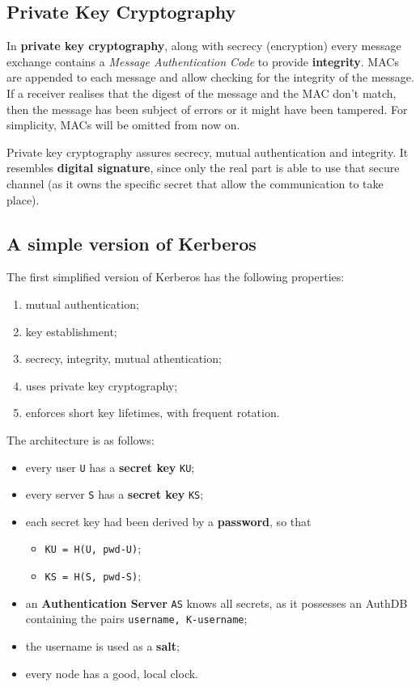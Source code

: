 \documentclass[10pt]{\classname}
\begin{document}
\subsection{Private Key Cryptography}

In \textbf{private key cryptography}, along with secrecy (encryption) every
message exchange contains a \emph{Message Authentication Code} to provide
\textbf{integrity}. MACs are appended to each message and allow checking for
the integrity of the message. If a receiver realises that the digest of the
message and the MAC don't match, then the message has been subject of errors or it
might have been tampered. For simplicity, MACs will be omitted from now on.

Private key cryptography assures secrecy, mutual authentication and integrity.
It resembles \textbf{digital signature}, since only the real part is able to
use that secure channel (as it owns the specific secret that allow the
communication to take place).

\subsection{A simple version of Kerberos}

The first simplified version of Kerberos has the following properties:
\begin{enumerate}
    \item mutual authentication;
    \item key establishment;
    \item secrecy, integrity, mutual athentication;
    \item uses private key cryptography;
    \item enforces short key lifetimes, with frequent rotation.
\end{enumerate}

The architecture is as follows:
\begin{itemize}
    \item every user \texttt{U} has a \textbf{secret key} \texttt{KU};
    \item every server \texttt{S} has a \textbf{secret key} \texttt{KS};
    \item each secret key had been derived by a \textbf{password}, so that
    \begin{itemize}
        \item \texttt{KU = H(U, pwd-U)};
        \item \texttt{KS = H(S, pwd-S)};
    \end{itemize}
    \item an \textbf{Authentication Server} \texttt{AS} knows all secrets, as it
        possesses an AuthDB containing the pairs \texttt{username, K-username};
    \item the username is used as a \textbf{salt};
    \item every node has a good, local clock.
\end{itemize}
\end{document}
